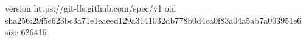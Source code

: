 version https://git-lfs.github.com/spec/v1
oid sha256:29f5c623bc3a71e1eaeed129a3141032db778b0d4ca0f83a04a5ab7a003951e6
size 626416
